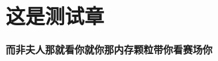 \documentclass{DemoRjz}[ctexfont]
\begin{document}
   
   
   
   
   \chapter{这是测试章}

   {\bfseries 而非夫人那就看你就你那内存颗粒带你看赛场你}
   


   \appendix

	
	
\end{document}
